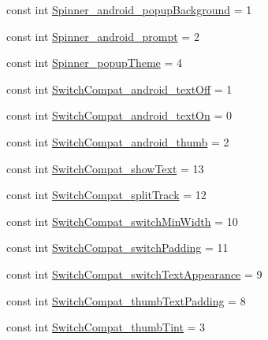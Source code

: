 \begin{DoxyCompactItemize}
\item 
const int \mbox{\hyperlink{class_f_w_p_s___app_1_1_droid_1_1_resource_1_1_styleable_a244ed6ecf34a07f18e7e194dbf897aff}{Spinner\+\_\+android\+\_\+popup\+Background}} = 1
\item 
const int \mbox{\hyperlink{class_f_w_p_s___app_1_1_droid_1_1_resource_1_1_styleable_aa3547f57127de84f02a56be0cdd32281}{Spinner\+\_\+android\+\_\+prompt}} = 2
\item 
const int \mbox{\hyperlink{class_f_w_p_s___app_1_1_droid_1_1_resource_1_1_styleable_a1a338e8bfb167ecd3b0144d81fc99f35}{Spinner\+\_\+popup\+Theme}} = 4
\item 
const int \mbox{\hyperlink{class_f_w_p_s___app_1_1_droid_1_1_resource_1_1_styleable_adc2a3e6b18536675b1cda9b4d27c3fe4}{Switch\+Compat\+\_\+android\+\_\+text\+Off}} = 1
\item 
const int \mbox{\hyperlink{class_f_w_p_s___app_1_1_droid_1_1_resource_1_1_styleable_a1bc832f8271afff76ba29c151d583081}{Switch\+Compat\+\_\+android\+\_\+text\+On}} = 0
\item 
const int \mbox{\hyperlink{class_f_w_p_s___app_1_1_droid_1_1_resource_1_1_styleable_a54ed92e620e743074e1dc2cf285b35d9}{Switch\+Compat\+\_\+android\+\_\+thumb}} = 2
\item 
const int \mbox{\hyperlink{class_f_w_p_s___app_1_1_droid_1_1_resource_1_1_styleable_ad5034af81a78bf00983615dec3f01115}{Switch\+Compat\+\_\+show\+Text}} = 13
\item 
const int \mbox{\hyperlink{class_f_w_p_s___app_1_1_droid_1_1_resource_1_1_styleable_a8d502aa6cee8b875f4ee72e93d9163e8}{Switch\+Compat\+\_\+split\+Track}} = 12
\item 
const int \mbox{\hyperlink{class_f_w_p_s___app_1_1_droid_1_1_resource_1_1_styleable_a5d6e792b0e2f15f1f5996f4273b5267a}{Switch\+Compat\+\_\+switch\+Min\+Width}} = 10
\item 
const int \mbox{\hyperlink{class_f_w_p_s___app_1_1_droid_1_1_resource_1_1_styleable_a7257dd130a98fd4f86a8850a9055840a}{Switch\+Compat\+\_\+switch\+Padding}} = 11
\item 
const int \mbox{\hyperlink{class_f_w_p_s___app_1_1_droid_1_1_resource_1_1_styleable_ae707b808d3aa03d3e81834bd699d6e06}{Switch\+Compat\+\_\+switch\+Text\+Appearance}} = 9
\item 
const int \mbox{\hyperlink{class_f_w_p_s___app_1_1_droid_1_1_resource_1_1_styleable_ad73a978016a8568c791e2bccc3432f01}{Switch\+Compat\+\_\+thumb\+Text\+Padding}} = 8
\item 
const int \mbox{\hyperlink{class_f_w_p_s___app_1_1_droid_1_1_resource_1_1_styleable_ae2bf9dc57f9964a7440238386590ba82}{Switch\+Compat\+\_\+thumb\+Tint}} = 3

\end{DoxyCompactItemize}
